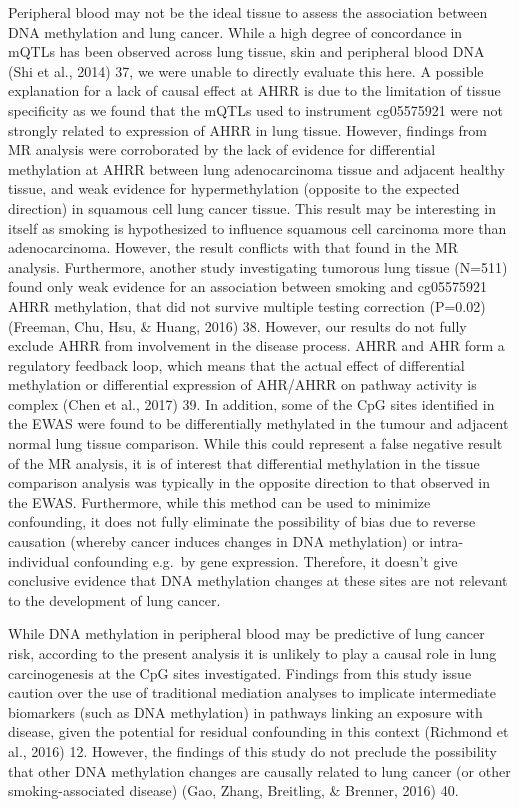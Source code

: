 \documentclass[11pt,twoside]{bristolthesis}
\begin{document}
Peripheral blood may not be the ideal tissue to assess the association between DNA methylation and lung cancer. While a high degree of concordance in mQTLs has been observed across lung tissue, skin and peripheral blood DNA (Shi et al., 2014) 37, we were unable to directly evaluate this here. A possible explanation for a lack of causal effect at AHRR is due to the limitation of tissue specificity as we found that the mQTLs used to instrument cg05575921 were not strongly related to expression of AHRR in lung tissue. However, findings from MR analysis were corroborated by the lack of evidence for differential methylation at AHRR between lung adenocarcinoma tissue and adjacent healthy tissue, and weak evidence for hypermethylation (opposite to the expected direction) in squamous cell lung cancer tissue. This result may be interesting in itself as smoking is hypothesized to influence squamous cell carcinoma more than adenocarcinoma. However, the result conflicts with that found in the MR analysis. Furthermore, another study investigating tumorous lung tissue (N=511) found only weak evidence for an association between smoking and cg05575921 AHRR methylation, that did not survive multiple testing correction (P=0.02) (Freeman, Chu, Hsu, \& Huang, 2016) 38. However, our results do not fully exclude AHRR from involvement in the disease process. AHRR and AHR form a regulatory feedback loop, which means that the actual effect of differential methylation or differential expression of AHR/AHRR on pathway activity is complex (Chen et al., 2017) 39. In addition, some of the CpG sites identified in the EWAS were found to be differentially methylated in the tumour and adjacent normal lung tissue comparison. While this could represent a false negative result of the MR analysis, it is of interest that differential methylation in the tissue comparison analysis was typically in the opposite direction to that observed in the EWAS. Furthermore, while this method can be used to minimize confounding, it does not fully eliminate the possibility of bias due to reverse causation (whereby cancer induces changes in DNA methylation) or intra-individual confounding e.g.~by gene expression. Therefore, it doesn't give conclusive evidence that DNA methylation changes at these sites are not relevant to the development of lung cancer.

While DNA methylation in peripheral blood may be predictive of lung cancer risk, according to the present analysis it is unlikely to play a causal role in lung carcinogenesis at the CpG sites investigated. Findings from this study issue caution over the use of traditional mediation analyses to implicate intermediate biomarkers (such as DNA methylation) in pathways linking an exposure with disease, given the potential for residual confounding in this context (Richmond et al., 2016) 12. However, the findings of this study do not preclude the possibility that other DNA methylation changes are causally related to lung cancer (or other smoking-associated disease) (Gao, Zhang, Breitling, \& Brenner, 2016) 40.
\end{document}
